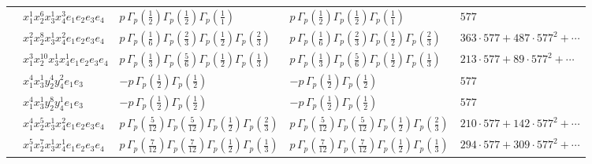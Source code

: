 \documentclass[11pt]{article}
\begin{document}
\begin{table}[ht]
{\begin{tabular}{@{}lllll@{}}
 & $x_{1}^{1} x_{2}^{6} x_{3}^{1} x_{4}^{3}  e_{1} e_{2} e_{3} e_{4}$ & $p \, \Gamma_p \left( \frac{1}{2} \right) \Gamma_p \left( \frac{1}{2} \right) \Gamma_p \left( \frac{1}{1} \right)$ & $p \, \Gamma_p \left( \frac{1}{2} \right) \Gamma_p \left( \frac{1}{2} \right) \Gamma_p \left( \frac{1}{1} \right)$ & $577$ \\
 & $x_{1}^{2} x_{2}^{8} x_{3}^{1} x_{4}^{2}  e_{1} e_{2} e_{3} e_{4}$ & $p \, \Gamma_p \left( \frac{1}{6} \right) \Gamma_p \left( \frac{2}{3} \right) \Gamma_p \left( \frac{1}{2} \right) \Gamma_p \left( \frac{2}{3} \right)$ & $p \, \Gamma_p \left( \frac{1}{6} \right) \Gamma_p \left( \frac{2}{3} \right) \Gamma_p \left( \frac{1}{2} \right) \Gamma_p \left( \frac{2}{3} \right)$ & $363{\cdot}577{+}487{\cdot}577^{2}{+}\cdots$ \\
 & $x_{1}^{3} x_{2}^{10} x_{3}^{1} x_{4}^{1}  e_{1} e_{2} e_{3} e_{4}$ & $p \, \Gamma_p \left( \frac{1}{3} \right) \Gamma_p \left( \frac{5}{6} \right) \Gamma_p \left( \frac{1}{2} \right) \Gamma_p \left( \frac{1}{3} \right)$ & $p \, \Gamma_p \left( \frac{1}{3} \right) \Gamma_p \left( \frac{5}{6} \right) \Gamma_p \left( \frac{1}{2} \right) \Gamma_p \left( \frac{1}{3} \right)$ & $213{\cdot}577{+}89{\cdot}577^{2}{+}\cdots$ \\
 & $x_{1}^{4} x_{3}^{1} y_{2}^{4} y_{4}^{2} e_{1} e_{3}$ & $- p \, \Gamma_p \left( \frac{1}{2} \right) \Gamma_p \left( \frac{1}{2} \right)$ & $- p \, \Gamma_p \left( \frac{1}{2} \right) \Gamma_p \left( \frac{1}{2} \right)$ & $577$ \\
 & $x_{1}^{4} x_{3}^{1} y_{2}^{8} y_{4}^{1} e_{1} e_{3}$ & $- p \, \Gamma_p \left( \frac{1}{2} \right) \Gamma_p \left( \frac{1}{2} \right)$ & $- p \, \Gamma_p \left( \frac{1}{2} \right) \Gamma_p \left( \frac{1}{2} \right)$ & $577$ \\
 & $x_{1}^{4} x_{2}^{5} x_{3}^{1} x_{4}^{2}  e_{1} e_{2} e_{3} e_{4}$ & $p \, \Gamma_p \left( \frac{5}{12} \right) \Gamma_p \left( \frac{5}{12} \right) \Gamma_p \left( \frac{1}{2} \right) \Gamma_p \left( \frac{2}{3} \right)$ & $p \, \Gamma_p \left( \frac{5}{12} \right) \Gamma_p \left( \frac{5}{12} \right) \Gamma_p \left( \frac{1}{2} \right) \Gamma_p \left( \frac{2}{3} \right)$ & $210{\cdot}577{+}142{\cdot}577^{2}{+}\cdots$ \\
 & $x_{1}^{5} x_{2}^{7} x_{3}^{1} x_{4}^{1}  e_{1} e_{2} e_{3} e_{4}$ & $p \, \Gamma_p \left( \frac{7}{12} \right) \Gamma_p \left( \frac{7}{12} \right) \Gamma_p \left( \frac{1}{2} \right) \Gamma_p \left( \frac{1}{3} \right)$ & $p \, \Gamma_p \left( \frac{7}{12} \right) \Gamma_p \left( \frac{7}{12} \right) \Gamma_p \left( \frac{1}{2} \right) \Gamma_p \left( \frac{1}{3} \right)$ & $294{\cdot}577{+}309{\cdot}577^{2}{+}\cdots$ \\

\end{tabular}}
\end{table}
\end{document}
